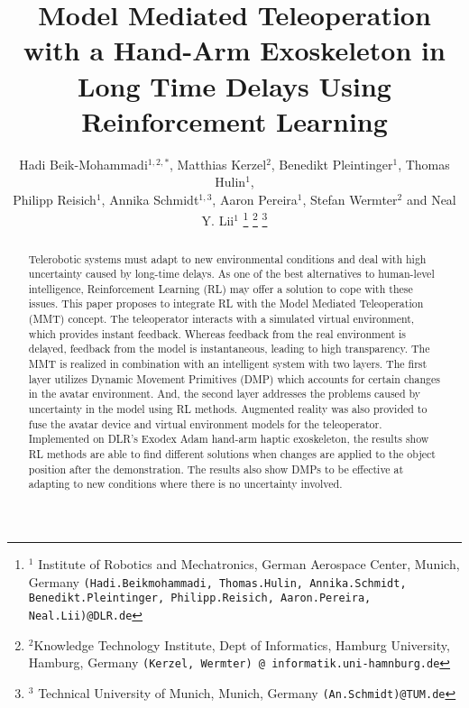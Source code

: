 \documentclass[letterpaper, 10 pt, conference]{ieeeconf}  %
\title{\LARGE \bf
Model Mediated Teleoperation with a Hand-Arm Exoskeleton in Long Time Delays Using Reinforcement Learning
}
\author{Hadi Beik-Mohammadi$^{1,2,*}$, Matthias Kerzel$^{2}$, Benedikt Pleintinger$^{1}$, Thomas Hulin$^{1}$,\\ Philipp Reisich$^{1}$, Annika Schmidt$^{1,3}$, Aaron Pereira$^{1}$, Stefan Wermter$^{2}$ and Neal Y. Lii$^{1}$ %
\thanks{$^{1}$ Institute of Robotics and Mechatronics, German Aerospace Center, Munich, Germany
        {\tt\small (Hadi.Beikmohammadi, Thomas.Hulin, Annika.Schmidt, Benedikt.Pleintinger, Philipp.Reisich, Aaron.Pereira, Neal.Lii)@DLR.de}}%
\thanks{$^{2}$Knowledge Technology Institute, Dept of Informatics, Hamburg University, Hamburg, Germany
        {\tt\small (Kerzel, Wermter) @ informatik.uni-hamnburg.de}}%
\thanks{$^{3}$  Technical University of Munich, Munich, Germany
        {\tt\small (An.Schmidt)@TUM.de}}%
}
\begin{document}
\maketitle
\thispagestyle{empty}
\pagestyle{empty}


\begin{abstract}
Telerobotic systems must adapt to new environmental conditions and deal with high uncertainty caused by long-time delays. As one of the best alternatives to human-level intelligence, Reinforcement Learning (RL) may offer a solution to cope with these issues.
This paper proposes to integrate RL with the Model Mediated Teleoperation (MMT) concept. The teleoperator interacts with a simulated virtual environment, which provides instant feedback. Whereas feedback from the real environment is delayed, feedback from the model is instantaneous, leading to high transparency.
The MMT is realized in combination with an intelligent system with two layers. The first layer utilizes Dynamic Movement Primitives (DMP) which accounts for certain changes in the avatar environment. And, the second layer addresses the problems caused by uncertainty in the model using RL methods. 
Augmented reality was also provided to fuse the avatar device and virtual environment models for the teleoperator.
Implemented on DLR's Exodex Adam hand-arm haptic exoskeleton, the results show RL methods are able to find different solutions when changes are applied to the object position after the demonstration. The results also show DMPs to be effective at adapting to new conditions where there is no uncertainty involved.

\end{abstract}

\end{document}
